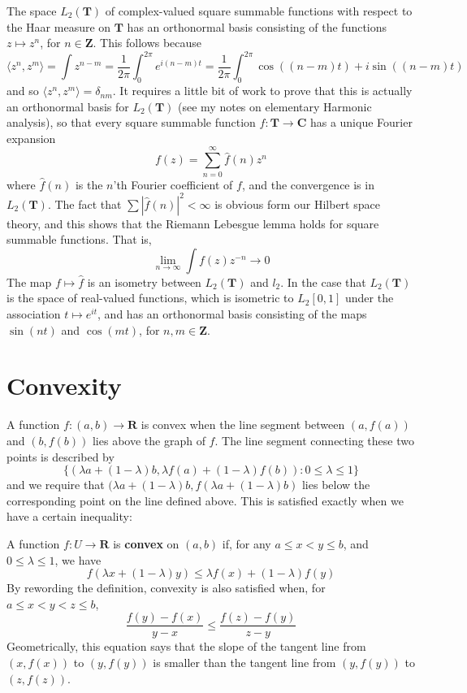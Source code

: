 \begin{example}
    The space $L_2(\mathbf{T})$ of complex-valued square summable functions with respect to the Haar measure on $\mathbf{T}$ has an orthonormal basis consisting of the functions $z \mapsto z^n$, for $n \in \mathbf{Z}$. This follows because
    \[ \langle z^n, z^m \rangle = \int z^{n-m} = \frac{1}{2 \pi} \int_0^{2\pi} e^{i (n-m)t} = \frac{1}{2\pi} \int_0^{2\pi} \cos((n-m)t) + i \sin((n - m)t) \]
    and so $\langle z^n, z^m \rangle = \delta_{nm}$. It requires a little bit of work to prove that this is actually an orthonormal basis for $L_2(\mathbf{T})$ (see my notes on elementary Harmonic analysis), so that every square summable function $f: \mathbf{T} \to \mathbf{C}$ has a unique Fourier expansion
    \[ f(z) = \sum_{n = 0}^\infty \widehat{f}(n) z^n \]
    where $\widehat{f}(n)$ is the $n$'th Fourier coefficient of $f$, and the convergence is in $L_2(\mathbf{T})$. The fact that $\sum |\widehat{f}(n)|^2 < \infty$ is obvious form our Hilbert space theory, and this shows that the Riemann Lebesgue lemma holds for square summable functions. That is,
    \[ \lim_{n \to \infty} \int f(z) z^{-n} \to 0 \]
    The map $f \mapsto \widehat{f}$ is an isometry between $L_2(\mathbf{T})$ and $l_2$. In the case that $L_2(\mathbf{T})$ is the space of real-valued functions, which is isometric to $L_2[0,1]$ under the association $t \mapsto e^{it}$, and has an orthonormal basis consisting of the maps $\sin(nt)$ and $\cos(mt)$, for $n,m \in \mathbf{Z}$.
\end{example}

\section{Convexity}

A function $f:(a,b) \to \mathbf{R}$ is convex when the line segment between $(a,f(a))$ and $(b,f(b))$ lies above the graph of $f$. The line segment connecting these two points is described by
%
\[ \{ (\lambda a + (1 - \lambda) b, \lambda f(a) + (1 - \lambda) f(b)) : 0 \leq \lambda \leq 1 \} \]
%
and we require that $(\lambda a + (1 - \lambda)b, f(\lambda a + (1 - \lambda)b)$ lies below the corresponding point on the line defined above. This is satisfied exactly when we have a certain inequality:

A function $f:U \to \mathbf{R}$ is {\bf convex} on $(a,b)$ if, for any $a \leq x < y \leq b$, and $0 \leq \lambda \leq 1$, we have
    \begin{equation} \label{convex1} f(\lambda x + (1 - \lambda) y) \leq \lambda f(x) + (1 - \lambda) f(y) \end{equation}
    By rewording the definition, convexity is also satisfied when, for $a \leq x < y < z \leq b$,
    \begin{equation} \label{convex2} \frac{f(y) - f(x)}{y - x} \leq \frac{f(z) - f(y)}{z - y} \end{equation}
    Geometrically, this equation says that the slope of the tangent line from $(x, f(x))$ to $(y, f(y))$ is smaller than the tangent line from $(y, f(y))$ to $(z, f(z))$.

